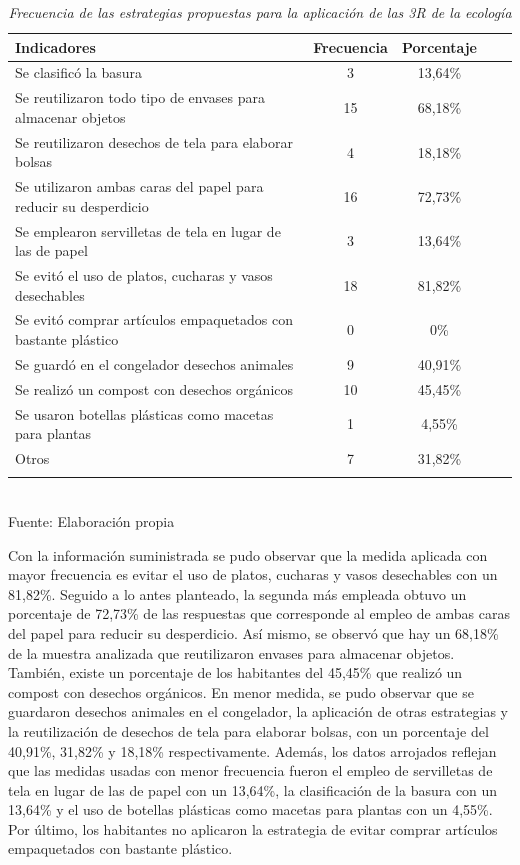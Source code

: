 \begin{table}[h!]
    \centering
    \captionsetup{singlelinecheck=false, justification=raggedright, labelsep=newline}
    \caption{\textit{Frecuencia de las estrategias propuestas para la aplicación de las 3R de la ecología}}
    \begin{tabular}{lcccc}
        \toprule
        Indicadores & Frecuencia & Porcentaje\\
        \midrule
        Se clasificó la basura & 3 & 13,64\% \\
        Se reutilizaron todo tipo de envases para almacenar objetos & 15 & 68,18\%\\
        Se reutilizaron desechos de tela para elaborar bolsas & 4 & 18,18\%\\
        Se utilizaron ambas caras del papel para reducir su desperdicio & 16 & 72,73\%\\
        Se emplearon servilletas de tela en lugar de las de papel & 3 & 13,64\%\\ 
        Se evitó el uso de platos, cucharas y vasos desechables & 18 & 81,82\%\\
        Se evitó comprar artículos empaquetados con bastante plástico & 0 & 0\%\\
        Se guardó en el congelador desechos animales & 9 & 40,91\%\\
        Se realizó un compost con desechos orgánicos & 10 & 45,45\%\\
        Se usaron botellas plásticas como macetas para plantas & 1 & 4,55\%\\
        Otros & 7 & 31,82\%\\
        \bottomrule\\
    \end{tabular}
    \\\RaggedRight Fuente: Elaboración propia
    \label{table:cuadro15}
\end{table}

Con la información suministrada se pudo observar que la medida aplicada con mayor frecuencia es evitar el uso de platos, cucharas y vasos desechables con un 81,82\%. Seguido a lo antes planteado, la segunda más empleada obtuvo un porcentaje de 72,73\% de las respuestas que corresponde al empleo de ambas caras del papel para reducir su desperdicio. Así mismo, se observó que hay un 68,18\% de la muestra analizada que reutilizaron envases para almacenar objetos. También, existe un porcentaje de los habitantes del 45,45\% que realizó un compost con desechos orgánicos. En menor medida, se pudo observar que se guardaron desechos animales en el congelador, la aplicación de otras estrategias y la reutilización de desechos de tela para elaborar bolsas, con un porcentaje del 40,91\%, 31,82\% y 18,18\% respectivamente. Además, los datos arrojados reflejan que las medidas usadas con menor frecuencia fueron el empleo de servilletas de tela en lugar de las de papel con un 13,64\%, la clasificación de la basura con un 13,64\% y el uso de botellas plásticas como macetas para plantas con un 4,55\%. Por último, los habitantes no aplicaron la estrategia de evitar comprar artículos empaquetados con bastante plástico.


